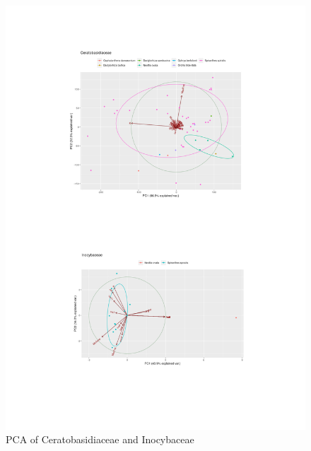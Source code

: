 \begin{figure}[htbp]
\centering
\includegraphics[keepaspectratio,width=\textwidth,height=0.75\textheight]{images/PCAcerino.png}
\caption{PCA of Ceratobasidiaceae and Inocybaceae}
\end{figure}

